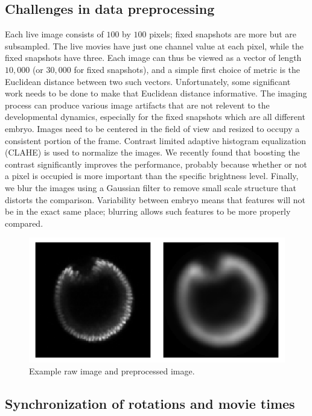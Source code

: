 \documentclass[12pt]{article}
\begin{document}
\subsection{Challenges in data preprocessing}

Each live image consists of $100$ by $100$ pixels; fixed snapshots are more but are subsampled. The live movies have just one channel value at each pixel, while the fixed snapshots have three. Each image can thus be viewed as a vector of length $10,000$ (or $30,000$ for fixed snapshots), and a simple first choice of metric is the Euclidean distance between two such vectors. Unfortunately, some significant work needs to be done to make that Euclidean distance informative. The imaging process can produce various image artifacts that are not relevent to the developmental dynamics, especially for the fixed snapshots which are all different embryo. Images need to be centered in the field of view and resized to occupy a consistent portion of the frame. Contrast limited adaptive histogram equalization (CLAHE) is used to normalize the images. We recently found that boosting the contrast significantly improves the performance, probably because whether or not a pixel is occupied is more important than the specific brightness level. Finally, we blur the images using a Gaussian filter to remove small scale structure that distorts the comparison. Variability between embryo means that features will not be in the exact same place; blurring allows such features to be more properly compared.

\begin{figure}[h]
\centering
\includegraphics[height=\liveheight]{figures/preprocess} \par
\caption{Example raw image and preprocessed image.}
\label{fig:pp}
\end{figure}

\subsection{Synchronization of rotations and movie times}
\end{document}
